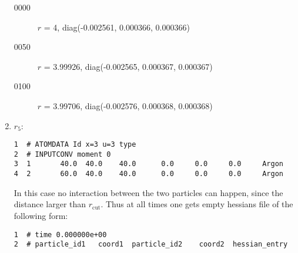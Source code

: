 \documentclass[a4paper]{article}
\begin{document}
\begin{enumerate}
\begin{description}
\item[{0000}] \(r\) = 4, diag(-0.002561, 0.000366, 0.000366)
\item[{0050}] \(r\) = 3.99926, diag(-0.002565, 0.000367, 0.000367)
\item[{0100}] \(r\) = 3.99706, diag(-0.002576, 0.000368, 0.000368)
\end{description}
\item \(r_5\):
\label{sec-1-4-1-6}
\begin{verbatim}
1  # ATOMDATA Id x=3 u=3 type
2  # INPUTCONV moment 0
3  1       40.0  40.0    40.0      0.0     0.0     0.0     Argon
4  2       60.0  40.0    40.0      0.0     0.0     0.0     Argon
\end{verbatim}
In this case no interaction between the two particles can happen, since the distance larger than \(r_{\textrm{cut}}\). Thus at all times one gets empty hessians file of the following form:
\begin{verbatim}
1  # time 0.000000e+00
2  # particle_id1   coord1  particle_id2    coord2  hessian_entry
\end{verbatim}
\end{enumerate}
\end{document}
